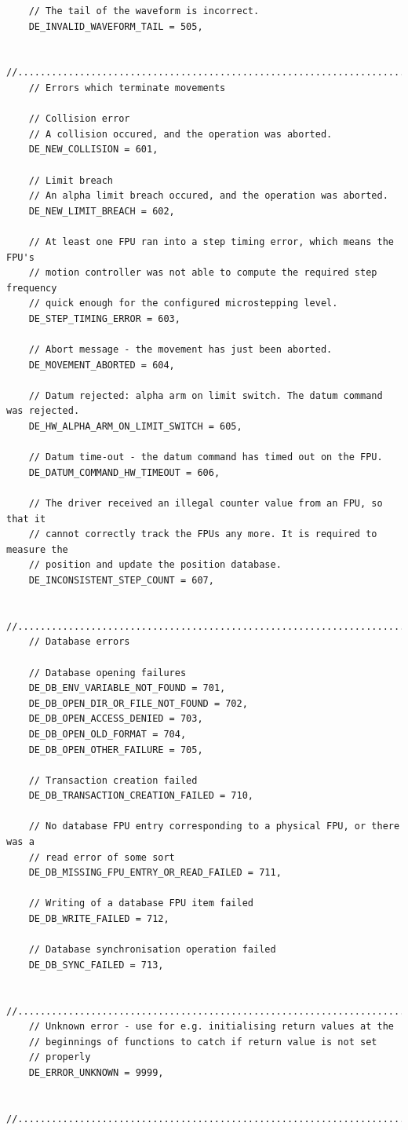 \documentclass[fontsize=12,a4paper]{scrreprt}
\begin{document}
\begin{verbatim}
    // The tail of the waveform is incorrect.
    DE_INVALID_WAVEFORM_TAIL = 505,

    //..........................................................................
    // Errors which terminate movements

    // Collision error
    // A collision occured, and the operation was aborted.
    DE_NEW_COLLISION = 601,

    // Limit breach
    // An alpha limit breach occured, and the operation was aborted.
    DE_NEW_LIMIT_BREACH = 602,

    // At least one FPU ran into a step timing error, which means the FPU's
    // motion controller was not able to compute the required step frequency
    // quick enough for the configured microstepping level.
    DE_STEP_TIMING_ERROR = 603,

    // Abort message - the movement has just been aborted.
    DE_MOVEMENT_ABORTED = 604,

    // Datum rejected: alpha arm on limit switch. The datum command was rejected.
    DE_HW_ALPHA_ARM_ON_LIMIT_SWITCH = 605,

    // Datum time-out - the datum command has timed out on the FPU.
    DE_DATUM_COMMAND_HW_TIMEOUT = 606,

    // The driver received an illegal counter value from an FPU, so that it
    // cannot correctly track the FPUs any more. It is required to measure the
    // position and update the position database.
    DE_INCONSISTENT_STEP_COUNT = 607,

    //..........................................................................
    // Database errors

    // Database opening failures
    DE_DB_ENV_VARIABLE_NOT_FOUND = 701,
    DE_DB_OPEN_DIR_OR_FILE_NOT_FOUND = 702,
    DE_DB_OPEN_ACCESS_DENIED = 703,
    DE_DB_OPEN_OLD_FORMAT = 704,
    DE_DB_OPEN_OTHER_FAILURE = 705,

    // Transaction creation failed
    DE_DB_TRANSACTION_CREATION_FAILED = 710,

    // No database FPU entry corresponding to a physical FPU, or there was a
    // read error of some sort
    DE_DB_MISSING_FPU_ENTRY_OR_READ_FAILED = 711,

    // Writing of a database FPU item failed
    DE_DB_WRITE_FAILED = 712,

    // Database synchronisation operation failed
    DE_DB_SYNC_FAILED = 713,

    //..........................................................................
    // Unknown error - use for e.g. initialising return values at the
    // beginnings of functions to catch if return value is not set
    // properly
    DE_ERROR_UNKNOWN = 9999,

    //..........................................................................
\end{verbatim}
\end{document}
